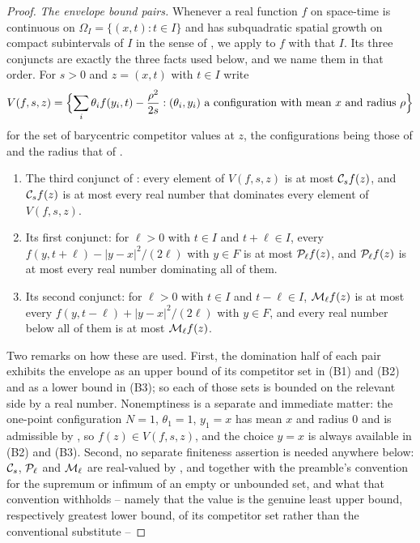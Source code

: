 \begin{proof}
\emph{The envelope bound pairs.} Whenever a real function $f$ on space-time is
continuous on $\Omega_I=\{(x,t):t\in I\}$ and has subquadratic spatial growth on
compact subintervals of $I$ in the sense of , we
apply  to $f$ with that $I$. Its three
conjuncts are exactly the three facts used below, and we name them in that
order. For $s>0$ and $z=(x,t)$ with $t\in I$ write
\[
  V(f,s,z)=\Bigl\{\sum_i\theta_if(y_i,t)-\frac{\rho^2}{2s}:
     (\theta_i,y_i)\text{ a configuration with mean }x\text{ and radius }
     \rho\Bigr\}
\]
for the set of barycentric competitor values at $z$, the configurations being
those of  and the radius that of .
\begin{enumerate}
\item[(B1)] The third conjunct of : every
element of $V(f,s,z)$ is at most $\mathcal{C}_sf(z)$, and $\mathcal{C}_sf(z)$ is at most
every real number that dominates every element of $V(f,s,z)$.
\item[(B2)] Its first conjunct: for $\ell>0$ with $t\in I$ and $t+\ell\in I$,
every $f(y,t+\ell)-|y-x|^2/(2\ell)$ with $y\in F$ is at most $\mathcal{P}_\ell f(z)$,
and $\mathcal{P}_\ell f(z)$ is at most every real number dominating all of them.
\item[(B3)] Its second conjunct: for $\ell>0$ with $t\in I$ and $t-\ell\in I$,
$\mathcal{M}_\ell f(z)$ is at most every $f(y,t-\ell)+|y-x|^2/(2\ell)$ with $y\in F$,
and every real number below all of them is at most $\mathcal{M}_\ell f(z)$.
\end{enumerate}
Two remarks on how these are used. First, the domination half of each pair
exhibits the envelope as an upper bound of its competitor set in (B1) and (B2)
and as a lower bound in (B3); so each of those sets is bounded on the relevant
side by a real number. Nonemptiness is a separate and immediate matter: the
one-point configuration $N=1$, $\theta_1=1$, $y_1=x$ has mean $x$ and radius
$0$ and is admissible by , so $f(z)\in V(f,s,z)$, and the
choice $y=x$ is always available in (B2) and (B3). Second, no separate
finiteness assertion is needed anywhere below: $\mathcal{C}_s$, $\mathcal{P}_\ell$ and
$\mathcal{M}_\ell$ are real-valued by ,  and
 together with the preamble's convention for the supremum or
infimum of an empty or unbounded set, and what that convention withholds --
namely that the value is the genuine least upper bound, respectively greatest
lower bound, of its competitor set rather than the conventional substitute --

\end{proof}
